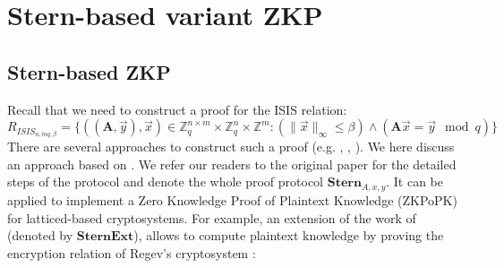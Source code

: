 

\section{Stern-based variant ZKP}
\label{sec:firstProcZKP}
\subsection{Stern-based ZKP}
\label{sec:Stern-basedZKP}
Recall that we need to construct a proof for the ISIS relation:
\[
  R_{ISIS_{n,mq,\beta}} = \{ ((\mathbf{A},\vec{y}),\vec{x})
  \in \mathbb{Z}_q^{n\times m} \times \mathbb{Z}_q^n
  \times \mathbb{Z}^m: (\|\vec{x}\|_\infty \leq \beta) \land
  (\mathbf{A}\vec{x} = \vec{y} \mod q) \}
\]
There are several approaches to construct such a proof (e.g. \cite{lyubashevsky2008lattice},
\cite{micciancio2003statistical}, \cite{stern1993new}). We here discuss an approach based on \cite{stern1993new}. We refer our readers to the original paper for the detailed steps of the protocol and denote the whole proof protocol
\(\mathbf{Stern}_{A,x,y}\). It can be applied to implement a Zero Knowledge Proof of
Plaintext Knowledge (ZKPoPK) for latticed-based cryptosystems. For example, an extension of the work of \cite{ling2013improved}  (denoted by \(\mathbf{SternExt}\)), allows to compute plaintext knowledge by proving the encryption relation
of Regev's cryptosystem \cite{regev2009lattices}:

